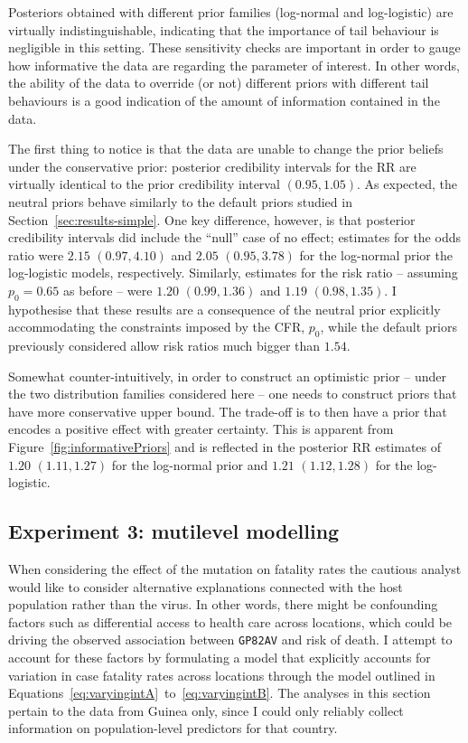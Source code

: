 Posteriors obtained with different prior families (log-normal and log-logistic) are virtually indistinguishable, indicating that the importance of tail behaviour is negligible in this setting.
These sensitivity checks are important in order to gauge how informative the data are regarding the parameter of interest. 
In other words, the ability of the data to override (or not) different priors with different tail behaviours is a good indication of the amount of information contained in the data.

The first thing to notice is that the data are unable to change the prior beliefs under the conservative prior: posterior credibility intervals for the RR are virtually identical to the prior credibility interval $(0.95, 1.05)$.
As expected, the neutral priors behave similarly to the default priors studied in Section~\ref{sec:results-simple}. 
One key difference, however, is that posterior credibility intervals did include the ``null'' case of no effect; estimates for the odds ratio were $2.15$ $(0.97, 4.10)$ and $2.05$ $(0.95, 3.78)$ for the log-normal prior the log-logistic models, respectively.
Similarly, estimates for the risk ratio -- assuming $p_0 = 0.65$ as before -- were $1.20$ $(0.99, 1.36)$ and $1.19$ $(0.98, 1.35)$.
I hypothesise that these results are a consequence of the neutral prior explicitly accommodating the constraints imposed by the CFR, $p_0$, while the default priors previously considered allow risk ratios much bigger than $1.54$.

Somewhat counter-intuitively, in order to construct an optimistic prior -- under the two distribution families considered here -- one needs to construct priors that have more conservative upper bound.
The trade-off is to then have a prior that encodes a positive effect with greater certainty.
This is apparent from Figure~\ref{fig:informativePriors} and is reflected in the posterior RR estimates of $1.20$ $(1.11, 1.27)$ for the log-normal prior and $1.21$ $(1.12, 1.28)$ for the log-logistic.

\subsection*{Experiment 3: mutilevel modelling}
\label{sec:results-multilevel}

When considering the effect of the mutation on fatality rates the cautious analyst would like to consider alternative explanations connected with the host population rather than the virus.
In other words, there might be confounding factors such as differential access to health care across locations, which could be driving the observed association between \verb|GP82AV| and risk of death.
I attempt to account for these factors by  formulating a model that explicitly accounts for variation in case fatality rates across locations through the model outlined in Equations~\ref{eq:varyingintA}~to~\ref{eq:varyingintB}.
The analyses in this section pertain to the data from Guinea only, since I could only reliably collect information on population-level predictors for that country.

